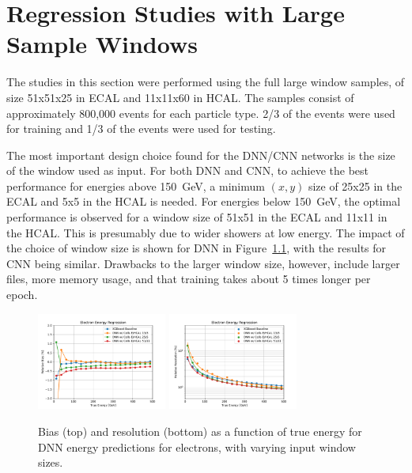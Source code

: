 \chapter{Regression Studies with Large Sample Windows}\label{app:large_window_regression}

The studies in this section were performed using the full large window samples, of size 51x51x25 in ECAL and 11x11x60 in HCAL.
The samples consist of approximately 800,000 events for each particle type.  2/3 of the events were used for training and 1/3 of the events were used for testing.

The most important design choice found for the DNN/CNN networks is the size of the window used as input.  For both DNN and CNN, to achieve the best performance for energies above 150~GeV, a minimum $(x,y)$ size of 25x25 in the ECAL and 5x5 in the HCAL is needed.  For energies below 150~GeV, the optimal performance is observed for a window size of 51x51 in the ECAL and 11x11 in the HCAL.  This is presumably due to wider showers at low energy.  The impact of the choice of window size is shown for DNN in Figure~\ref{fig:reg_dnn_numcells}, with the results for CNN being similar.  Drawbacks to the larger window size, however, include larger files, more memory usage, and that training takes about 5 times longer per epoch.

\begin{figure}[htbp]
\centering
\includegraphics[width=0.38\textwidth]{Images/Calo/bias_vs_E_EleFixed_nn_numcells_zoom.pdf}
\includegraphics[width=0.38\textwidth]{Images/Calo/res_vs_E_EleFixed_nn_numcells_fits.pdf}
\caption{Bias (top) and resolution (bottom) as a function of true energy for DNN energy predictions for electrons, with varying input window sizes.
}
\label{fig:reg_dnn_numcells}
\end{figure}

